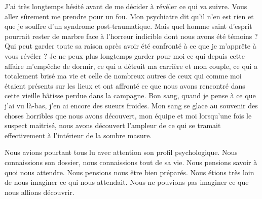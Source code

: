 J’ai très longtemps hésité avant de me décider à révéler ce qui va suivre. Vous
allez sûrement me prendre pour un fou. Mon psychiatre dit qu'il n'en est rien 
et que je souffre d'un syndrome post-traumatique. Mais quel homme saint 
d'esprit pourrait rester de marbre face à l'horreur indicible dont nous avons 
été témoins ? Qui peut garder toute sa raison après avoir été confronté à ce 
que je m’apprête à vous révéler ? Je ne peux plus longtemps garder pour moi ce 
qui depuis cette affaire m’empêche de dormir, ce qui a détruit ma carrière et 
mon couple, ce qui a totalement brisé ma vie et celle de nombreux autres de 
ceux qui comme moi étaient présents sur les lieux et ont affronté ce que nous 
avons rencontré dans cette vieille bâtisse perdue dans la campagne. Bon sang, 
quand je pense à ce que j’ai vu là-bas, j’en ai encore des sueurs
froides. Mon sang se glace au souvenir des choses horribles que nous avons
découvert, mon équipe et moi lorsqu'une fois le suspect maitrisé, nous avons 
découvert l'ampleur de ce qui se tramait effectivement à l’intérieur de la 
sombre masure.

Nous avions pourtant tous lu avec attention son profil psychologique. Nous
connaissions son dossier, nous connaissions tout de sa vie. Nous pensions 
savoir à quoi nous attendre. Nous pensions nous être bien préparés. Nous étions 
très loin de nous imaginer ce qui nous attendait. Nous ne pouvions pas imaginer 
ce que nous allions découvrir. 

